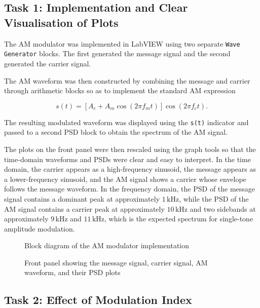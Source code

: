 \documentclass[../../main.tex]{subfiles}
\begin{document}
\subsection{Task 1: Implementation and Clear Visualisation of Plots}

The AM modulator was implemented in LabVIEW using two separate \texttt{Wave Generator} blocks. The first generated the message signal and the second generated the carrier signal.

The AM waveform was then constructed by combining the message and carrier through arithmetic blocks so as to implement the standard AM expression

\[
s(t)=\left[A_c + A_m \cos(2\pi f_m t)\right]\cos(2\pi f_c t).
\]

The resulting modulated waveform was displayed using the \texttt{s(t)} indicator and passed to a second PSD block to obtain the spectrum of the AM signal.

The plots on the front panel were then rescaled using the graph tools so that the time-domain waveforms and PSDs were clear and easy to interpret. In the time domain, the carrier appears as a high-frequency sinusoid, the message appears as a lower-frequency sinusoid, and the AM signal shows a carrier whose envelope follows the message waveform. In the frequency domain, the PSD of the message signal contains a dominant peak at approximately $1\,\text{kHz}$, while the PSD of the AM signal contains a carrier peak at approximately $10\,\text{kHz}$ and two sidebands at approximately $9\,\text{kHz}$ and $11\,\text{kHz}$, which is the expected spectrum for single-tone amplitude modulation.

\begin{figure}[htbp]
    \centering
    \caption{Block diagram of the AM modulator implementation}
\end{figure}

\begin{figure}[htbp]
    \centering
    \caption{Front panel showing the message signal, carrier signal, AM waveform, and their PSD plots}
\end{figure}

\FloatBarrier

\subsection{Task 2: Effect of Modulation Index}
\end{document}

